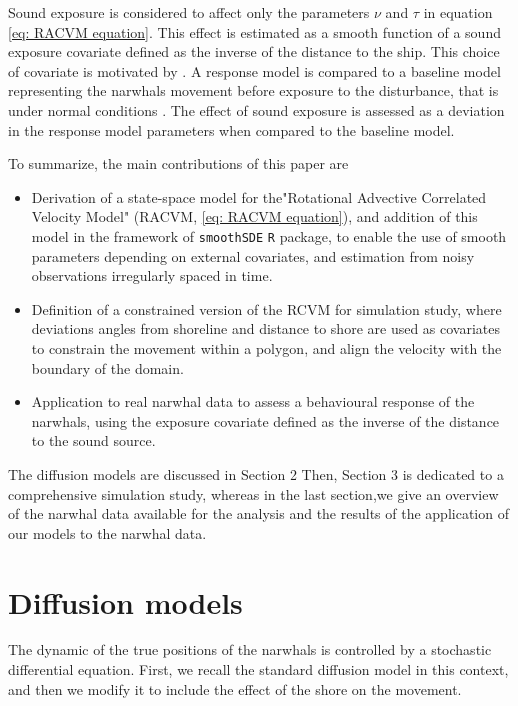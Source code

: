 \documentclass[11pt]{article}
\newcommand {\1}{\mathbb{1}}
\begin{document}
Sound exposure is considered to affect only the parameters $\nu$ and $\tau$ in equation \ref{eq: RACVM equation}. This effect is estimated as a smooth function of a sound exposure covariate defined as the inverse of the distance to the ship. This choice of covariate is motivated by \cite{heide-jorgensen_behavioral_2021}. A response model is compared to a baseline model representing the narwhals movement before exposure to the disturbance, that is under normal conditions \cite{michelot_continuous-time_2022}.
The effect of sound exposure is assessed as a deviation in the response model parameters when compared to the baseline model.



To summarize, the main contributions of this paper are
\begin{itemize}
	\item Derivation of a state-space model for the"Rotational Advective Correlated Velocity Model" (RACVM, \ref{eq: RACVM equation}), and addition of this model in the framework of \texttt{smoothSDE} \texttt{R} package, to enable the use of smooth parameters depending on external covariates, and estimation from noisy observations irregularly spaced in time.
	\item Definition of a constrained version of the RCVM for simulation study, where deviations angles from shoreline and distance to shore are used as covariates to constrain the movement within a polygon, and align the velocity with the boundary of the domain.
	\item Application to real narwhal data to assess a behavioural response of the narwhals, using the exposure covariate defined as the inverse of the distance to the sound source.
\end{itemize}

The diffusion models are discussed in Section 2
Then,  Section 3 is dedicated to a comprehensive simulation study, whereas in the last section,we give an overview of the narwhal data available for the analysis and the results of the application of our models to the narwhal data.


\section{Diffusion models}

The dynamic of the true positions of the narwhals is controlled by a stochastic differential equation. First, we recall the standard diffusion model in this context, and then we modify it to include the effect of the shore on the movement.
\end{document}
